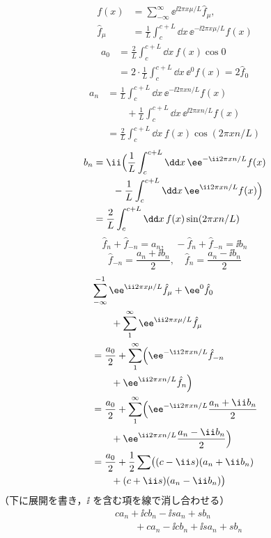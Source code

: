 \begin{align*}
  f(x)&=\sum_{-\infty}^{\infty}\ee^{\ii2\pi x\mu/L}\hat{f}_{\mu},\\
  \hat{f}_{\mu}&=\frac{1}{L}\int_{c}^{c+L}\dd x\,\ee^{-\ii2\pi x\mu/L}f(x)
\end{align*}
\begin{align*}
  a_0&=\frac{2}{L}\int_{c}^{c+L}\dd x\,f(x)\cos0\\
  &=2\cdot\frac{1}{L}\int_{c}^{c+L}\dd x\,\ee^{0}f(x)=2\hat{f}_0
\end{align*}
\begin{align*}
  a_n&=\frac{1}{L}\int_{c}^{c+L}\dd x\,\ee^{-\ii2\pi xn/L}f(x)\\
  &\qquad+\frac{1}{L}\int_{c}^{c+L}\dd x\,\ee^{\ii2\pi xn/L}f(x)\\
  &=\frac{2}{L}\int_{c}^{c+L}\dd x\,f(x)\cos(2\pi xn/L)
\end{align*}
\begin{align*}
  b_n&=\ii\Bigl(\frac{1}{L}\int_{c}^{c+L}\dd x\,\ee^{-\ii2\pi xn/L}f(x)\\
  &\qquad-\frac{1}{L}\int_{c}^{c+L}\dd x\,\ee^{\ii2\pi xn/L}f(x)\Bigr)\\
  &=\frac{2}{L}\int_{c}^{c+L}\dd x\,f(x)\sin(2\pi xn/L)
\end{align*}
\[ \hat{f}_n+\hat{f}_{-n}=a_n,\quad -\hat{f}_n+\hat{f}_{-n}=\ii b_n \]
\[ \hat{f}_{-n}=\frac{a_n+\ii b_n}{2},\quad \hat{f}_n=\frac{a_n-\ii b_n}{2} \]
\begin{align*}
  &\sum_{-\infty}^{-1}\ee^{\ii2\pi x\mu/L}\hat{f}_{\mu}+\ee^{0}\hat{f}_0\\
  &\qquad+\sum_{1}^{\infty}\ee^{\ii2\pi x\mu/L}\hat{f}_{\mu}\\
  &=\frac{a_0}{2}+\sum_{1}^{\infty}\Bigl(\ee^{-\ii2\pi xn/L}\hat{f}_{-n}\\
  &\qquad+\ee^{\ii2\pi xn/L}\hat{f}_{n}\Bigr)\\
  &=\frac{a_0}{2}+\sum_{1}^{\infty}\Bigl(\ee^{-\ii2\pi xn/L}\frac{a_n+\ii b_n}{2}\\
  &\qquad+\ee^{\ii2\pi xn/L}\frac{a_n-\ii b_n}{2}\Bigr)\\
  &=\frac{a_0}{2}+\frac{1}{2}\sum\bigl((c-\ii s)(a_n+\ii b_n)\\
  &\qquad+(c+\ii s)(a_n-\ii b_n)\bigr)
\end{align*}
（下に展開を書き，$\ii$ を含む項を線で消し合わせる）
\begin{align*}
  &ca_n+\ii cb_n-\ii sa_n+sb_n\\
  &\qquad+ca_n-\ii cb_n+\ii sa_n+sb_n
\end{align*}
